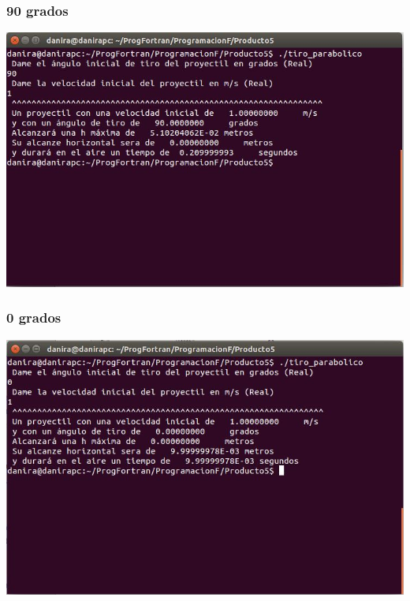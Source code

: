 \documentclass[10pt]{article}
\begin{document}
\subsubsection{90 grados}
\begin{center}
   \includegraphics[scale=0.5]{tiro90.JPG}
\end{center}

\subsubsection{0 grados}
\begin{center}
   \includegraphics[scale=0.5]{tiro0.JPG}
\end{center}
\end{document}
